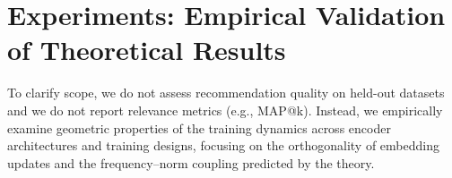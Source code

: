 \section{Experiments: Empirical Validation of Theoretical Results}
\label{sec:experiments}

To clarify scope, we do not assess recommendation quality on held-out datasets and we do not report relevance metrics (e.g., MAP@k). 
Instead, we empirically examine geometric properties of the training dynamics across encoder architectures and training designs, focusing on the orthogonality of embedding updates and the frequency–norm coupling predicted by the theory.




